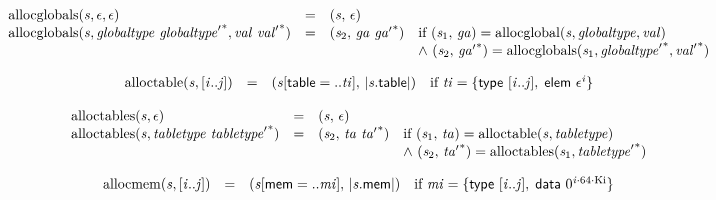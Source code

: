 $$
\begin{array}{@{}lcl@{}l@{}}
{\mathrm{allocglobals}}({\mathit{s}}, \epsilon, \epsilon) &=& ({\mathit{s}},\, \epsilon) &  \\
{\mathrm{allocglobals}}({\mathit{s}}, {\mathit{globaltype}}~{{\mathit{globaltype}'}^\ast}, {\mathit{val}}~{{\mathit{val}'}^\ast}) &=& ({\mathit{s}}_{{2}},\, {\mathit{ga}}~{{\mathit{ga}'}^\ast}) &\quad
  \mbox{if}~({\mathit{s}}_{{1}},\, {\mathit{ga}}) = {\mathrm{allocglobal}}({\mathit{s}}, {\mathit{globaltype}}, {\mathit{val}}) \\
 &&&\quad {\land}~({\mathit{s}}_{{2}},\, {{\mathit{ga}'}^\ast}) = {\mathrm{allocglobals}}({\mathit{s}}_{{1}}, {{\mathit{globaltype}'}^\ast}, {{\mathit{val}'}^\ast}) \\
\end{array}
$$

$$
\begin{array}{@{}lcl@{}l@{}}
{\mathrm{alloctable}}({\mathit{s}}, {}[{\mathit{i}} .. {\mathit{j}}]) &=& ({\mathit{s}}{}[\mathsf{table} = ..{\mathit{ti}}],\, {|{\mathit{s}}.\mathsf{table}|}) &\quad
  \mbox{if}~{\mathit{ti}} = \{ \begin{array}[t]{@{}l@{}}
\mathsf{type}~{}[{\mathit{i}} .. {\mathit{j}}],\; \mathsf{elem}~{\epsilon^{{\mathit{i}}}} \}\end{array} \\
\end{array}
$$

$$
\begin{array}{@{}lcl@{}l@{}}
{\mathrm{alloctables}}({\mathit{s}}, \epsilon) &=& ({\mathit{s}},\, \epsilon) &  \\
{\mathrm{alloctables}}({\mathit{s}}, {\mathit{tabletype}}~{{\mathit{tabletype}'}^\ast}) &=& ({\mathit{s}}_{{2}},\, {\mathit{ta}}~{{\mathit{ta}'}^\ast}) &\quad
  \mbox{if}~({\mathit{s}}_{{1}},\, {\mathit{ta}}) = {\mathrm{alloctable}}({\mathit{s}}, {\mathit{tabletype}}) \\
 &&&\quad {\land}~({\mathit{s}}_{{2}},\, {{\mathit{ta}'}^\ast}) = {\mathrm{alloctables}}({\mathit{s}}_{{1}}, {{\mathit{tabletype}'}^\ast}) \\
\end{array}
$$

$$
\begin{array}{@{}lcl@{}l@{}}
{\mathrm{allocmem}}({\mathit{s}}, {}[{\mathit{i}} .. {\mathit{j}}]) &=& ({\mathit{s}}{}[\mathsf{mem} = ..{\mathit{mi}}],\, {|{\mathit{s}}.\mathsf{mem}|}) &\quad
  \mbox{if}~{\mathit{mi}} = \{ \begin{array}[t]{@{}l@{}}
\mathsf{type}~{}[{\mathit{i}} .. {\mathit{j}}],\; \mathsf{data}~{0^{{\mathit{i}} \cdot 64 \cdot {\mathrm{Ki}}}} \}\end{array} \\
\end{array}
$$

